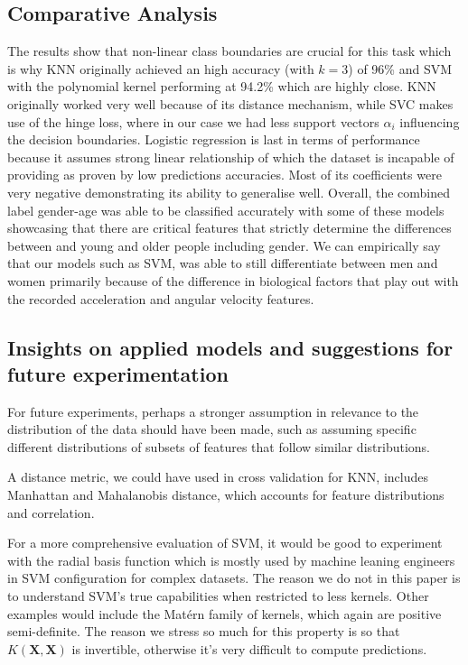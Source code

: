 \documentclass[10pt,twocolumn]{article}
\begin{document}
\subsection{Comparative Analysis}
The results show that non-linear class boundaries are crucial for this task which is why KNN originally achieved an high accuracy (with $k=3$) of 96\% and SVM with the polynomial kernel performing at 94.2\% which are highly close. KNN originally worked very well because of its distance mechanism, while SVC makes use of the hinge loss, where in our case we had less support vectors $\alpha_i$ influencing the decision boundaries. Logistic regression is last in terms of performance because it assumes strong linear relationship of which the dataset is incapable of providing as proven by low predictions accuracies. Most of its coefficients were very negative demonstrating its ability to generalise well. Overall, the combined label gender-age was able to be classified accurately with some of these models showcasing that there are critical features that strictly determine the differences between and young and older people including gender. We can empirically say that our models such as SVM, was able to still differentiate between men and women primarily because of the difference in biological factors that play out with the recorded  acceleration and angular velocity features.
\subsection{Insights on applied models and suggestions for future experimentation}
For future experiments, perhaps a stronger assumption in relevance to the distribution of the data should have been made, such as assuming specific different distributions of subsets of features that follow similar distributions.

A distance metric, we could have used in cross validation for KNN, includes Manhattan and Mahalanobis distance, which accounts for feature distributions and correlation.

For a more comprehensive evaluation of SVM, it would be good to experiment with the radial basis function which is mostly used by machine leaning engineers in SVM configuration for complex datasets. The reason we do not in this paper is to understand SVM's true capabilities when restricted to less kernels. Other examples would include the Matérn family of kernels, which again are positive semi-definite. The reason we stress so much for this property is so that $\mathbf{}{K}(\mathbf{X},\mathbf{X})$ is invertible, otherwise it's very difficult to compute predictions.
\end{document}
